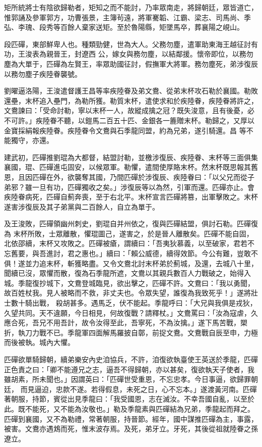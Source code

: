 \begin{pinyinscope}
 矩所統將士有陰欲歸勒者，矩知之而不能討，乃率眾南走，將歸朝廷，眾皆道亡，惟郭誦及參軍郭方，功曹張景，主簿茍遠，將軍騫韜、江霸、梁志、司馬尚、季弘、李瑰、段秀等百餘人棄家送矩。至於魯陽縣，矩墜馬卒，葬襄陽之峴山。



 段匹磾，東部鮮卑人也。種類勁健，世為大人。父務勿塵，遣軍助東海王越征討有功，王浚表為親晉王，封遼西
 公，嫁女與務勿塵，以結鄰援。懷帝即位，以務勿塵為大單于，匹磾為左賢王，率眾助國征討，假撫軍大將軍。務勿塵死，弟涉復辰以務勿塵子疾陸眷襲號。



 劉曜逼洛陽，王浚遣督護王昌等率疾陸眷及弟文鴦、從弟末杯攻石勒於襄國。勒敗還壘，末杯追入壘門，為勒所獲。勒質末杯，遣使求和於疾陸眷，疾陸眷將許之，文鴦諫曰：「受命討勒，寧以末杯一人，故縱成擒之冠？既失浚意，且有後憂，必不可許。」疾陸眷不聽，以鎧馬二百五十匹、金銀各一簏贈末杯。勒歸之，又厚以金寶採絹報疾陸眷。疾陸眷令文鴦與石季龍同盟，約為兄弟，遂引騎還。昌
 等不能獨守，亦還。



 建武初，匹磾推劉琨為大都督，結盟討勒，並檄涉復辰、疾陸眷、末杯等三面俱集襄國，琨、匹磾進屯固安，以候眾軍。勒懼，遣間使厚賂末杯。然末杯既思報其舊恩，且因匹磾在外，欲襲奪其國，乃間匹磾於涉復辰、疾陸眷曰：「以父兄而從子弟邪？雖一旦有功，匹磾獨收之矣。」涉復辰等以為然，引軍而還。匹磾亦止。會疾陸眷病死，匹磾自薊奔喪，至于右北平。末杯宣言匹磾將篡，出軍擊敗之。末杯遂害涉復辰及其子弟黨與二百餘人，自立為單于。



 及王浚敗，匹磾領幽州刺史，劉琨自并州依之，復與匹磾結盟，俱討石勒。匹磾復為
 末杯所敗，士眾離散，懼琨圖己，遂害之，於是晉人離散矣。匹磾不能自固，北依邵續，末杯又攻敗之。匹磾被瘡，謂續曰：「吾夷狄慕義，以至破家，君若不忘舊要，與吾進討，君之惠也。」續曰：「賴公威德，續得效節。今公有難，豈敢不俱！遂並力追末杯，斬獲略盡。又令文鴦北討末杯弟於薊城，及還，去城八十里，聞續已沒，眾懼而散，復為石季龍所遮，文鴦以其親兵數百人力戰破之，始得入城。季龍復抄城下，文鴦登城臨見，欲出擊之，匹磾不許。文鴦曰：「我以勇聞，故百姓杖我。見人被略而不救，非丈夫也。令眾失望，誰復為我致死乎！」遂將壯士數十騎出戰，
 殺胡甚多。遇馬乏，伏不能起。季龍呼曰：「大兄與我俱是戎狄，久望共同。天不違願，今日相見，何故復戰？請釋杖。」文鴦罵曰：「汝為寇虐，久應合死，吾兄不用吾計，故令汝得至此，吾寧死，不為汝擒。」遂下馬苦戰，槊折，執刀力戰不已。季龍軍四面解馬羅披自鄣，前捉文鴦。文鴦戰自辰至申，力極而後被執。城內大懼。



 匹磾欲單騎歸朝，續弟樂安內史洎協兵，不許，洎復欲執臺使王英送於季龍，匹磾正色責之曰：「卿不能遵兄之志，逼吾不得歸朝，亦以甚矣，復欲執天子使者，我雖胡素，所未聞也。」因謂英曰：「匹磾世受重恩，不忘忠孝。今日事逼，欲歸罪朝廷，
 而見逼迫，忠款不遂。若得假息，未死之日，心不忘本。」遂渡黃河南。匹磾著朝服，持節，賓從出見季龍曰：「我受國恩，志在滅汝。不幸吾國自亂，以至於此。既不能死，又不能為汝敬也。」勒及季龍素與匹磾結為兄弟，季龍起而拜之。匹磾到襄國，又不為勒禮，常著朝服，持晉節。經年，國中謀推匹磾為主，事露，被害。文鴦亦遇鴆而死，惟末波存焉。及死，弟牙立。牙死，其後從祖就陸眷之孫遼立。




\end{pinyinscope}
